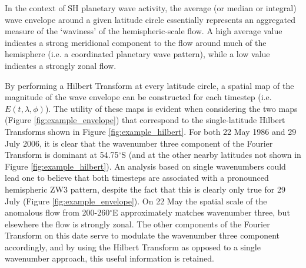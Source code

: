 In the context of SH planetary wave activity, the average (or median or integral) wave envelope around a given latitude circle essentially represents an aggregated measure of the `waviness' of the hemispheric-scale flow. A high average value indicates a strong meridional component to the flow around much of the hemisphere (i.e. a coordinated planetary wave pattern), while a low value indicates a strongly zonal flow. 

By performing a Hilbert Transform at every latitude circle, a spatial map of the magnitude of the wave envelope can be constructed for each timestep (i.e. $E(t,\lambda,\phi)$). The utility of these maps is evident when considering the two maps (Figure \ref{fig:example_envelope}) that correspond to the single-latitude Hilbert Transforms shown in Figure \ref{fig:example_hilbert}. For both 22 May 1986 and 29 July 2006, it is clear that the wavenumber three component of the Fourier Transform is dominant at 54.75$^{\circ}$S (and at the other nearby latitudes not shown in Figure \ref{fig:example_hilbert}). An analysis based on single wavenumbers could lead one to believe that both timesteps are associated with a pronounced hemispheric ZW3 pattern, despite the fact that this is clearly only true for 29 July (Figure \ref{fig:example_envelope}). On 22 May the spatial scale of the anomalous flow from 200-260$^{\circ}$E approximately matches wavenumber three, but elsewhere the flow is strongly zonal. The other components of the Fourier Transform on this date serve to modulate the wavenumber three component accordingly, and by using the Hilbert Transform as opposed to a single wavenumber approach, this useful information is retained.
